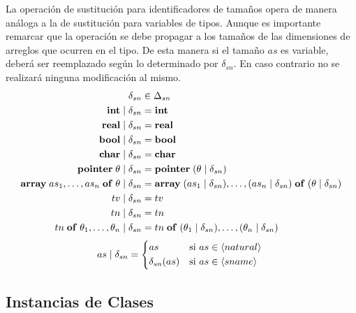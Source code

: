 La operación de sustitución para identificadores de tamaños opera de manera análoga a la de sustitución para variables de tipos.
Aunque es importante remarcar que la operación se debe propagar a los tamaños de las dimensiones de arreglos que ocurren en el tipo.
De esta manera si el tamaño $as$ es variable, deberá ser reemplazado según lo determinado por $\delta_{sn}$.
En caso contrario no se realizará ninguna modificación al mismo.
\begin{align*}
\delta_{sn}
&\in
\Delta_{sn}
\\
\mathbf{int} \mid \delta_{sn}
&=
\mathbf{int}
\\
\mathbf{real} \mid \delta_{sn}
&=
\mathbf{real}
\\
\mathbf{bool} \mid \delta_{sn}
&=
\mathbf{bool}
\\
\mathbf{char} \mid \delta_{sn}
&=
\mathbf{char}
\\
\mathbf{pointer} \; \theta \mid \delta_{sn}
&=
\mathbf{pointer} \; (\theta \mid \delta_{sn})
\\
\mathbf{array} \; as_1, \ldots, as_n \; \mathbf{of} \; \theta \mid \delta_{sn}
&=
\mathbf{array} \; (as_1 \mid \delta_{sn}), \ldots, (as_n \mid \delta_{sn}) \; \mathbf{of} \; (\theta \mid \delta_{sn})
\\
tv \mid \delta_{sn}
&=
tv
\\
tn \mid \delta_{sn}
&=
tn
\\
tn \; \mathbf{of} \; \theta_1, \ldots, \theta_n \mid \delta_{sn}
&=
tn \; \mathbf{of} \; (\theta_1 \mid \delta_{sn}), \ldots, (\theta_n \mid \delta_{sn})
\end{align*}
\begin{align*}
as \mid \delta_{sn} =
\begin{cases*}
as
&
si $as \in \NT{natural}$
\\
\delta_{sn}(as)
&
si $as \in \NT{sname}$
\end{cases*}
\end{align*}

\subsection{Instancias de Clases}

